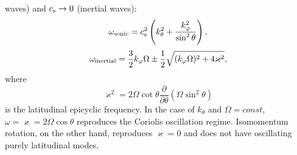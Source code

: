 \documentclass[usenatbib,onecolumn]{mnras}
\newcommand{\ppardir}[2]{\ensuremath{\frac{\partial }{\partial #1} \left( #2\right)}}
\newcommand{\cs}{\ensuremath{c_{\rm s}}}
\begin{document}
waves) and $\cs \to 0$ (inertial waves):
\begin{equation}\label{E:WKB:sonic}
 \displaystyle  \omega_{\rm sonic} = \cs^2 \left( k_\theta^2 + \frac{k_\varphi^2}{\sin^2\theta}\right),
\end{equation}
\begin{equation}\label{E:WKB:inertial}
\displaystyle   \omega_{\rm inertial} = \frac{3}{2}k_\varphi \Omega \pm
  \frac{1}{2}\sqrt{(k_\varphi \Omega)^2 + 4\varkappa^2},
\end{equation}
where
\begin{equation}\label{E:WKB:varkappa}
  \varkappa^2 = 2\Omega \cot\theta \ppardir{\theta}{\Omega \sin^2\theta}
\end{equation}
is the latitudinal epicyclic frequency. In the case of
$k_\theta$ and $\Omega=const$, $\omega = \varkappa = 2\Omega \cos\theta$
reproduces the Coriolis oscillation regime. Isomomentum rotation, on the other
hand, reproduces $\varkappa = 0$ and does not have oscillating purely latitudinal
modes.




\label{lastpage}
\end{document}
